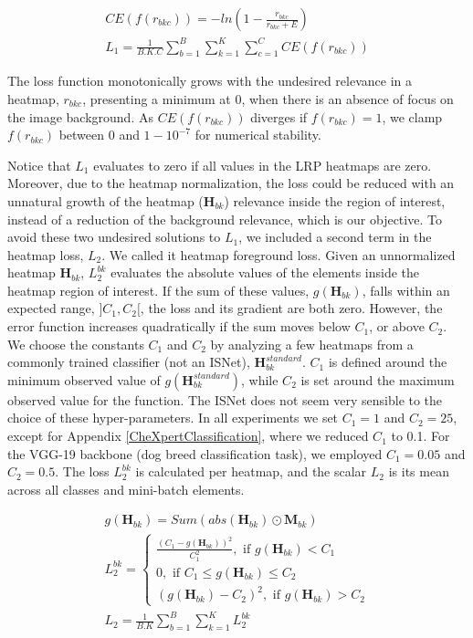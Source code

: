 \documentclass[fleqn,10pt]{wlscirep}
\begin{document}
{\begin{gather}
CE(f(r_{bkc}))=-ln(1-\frac{r_{bkc}}{r_{bkc}+E})\\
L_{1}=\frac{1}{B.K.C}\sum_{b=1}^{B}\sum_{k=1}^{K}\sum_{c=1}^{C}CE(f(r_{bkc}))
\end{gather}

The loss function monotonically grows with the undesired relevance in a heatmap, $r_{bkc}$, presenting a minimum at 0, when there is an absence of focus on the image background. As $CE(f(r_{bkc}))$ diverges if $f(r_{bkc})=1$, we clamp $f(r_{bkc})$ between 0 and $1-10^{-7}$ for numerical stability.

Notice that $L_{1}$ evaluates to zero if all values in the LRP heatmaps are zero. Moreover, due to the heatmap normalization, the loss could be reduced with an unnatural growth of the heatmap ($\bm{H}_{bk}$) relevance inside the region of interest, instead of a reduction of the background relevance, which is our objective. To avoid these two undesired solutions to $L_{1}$, we included a second term in the heatmap loss, $L_{2}$. We called it heatmap foreground loss. Given an unnormalized heatmap $\bm{H}_{bk}$, $L_{2}^{bk}$ evaluates the absolute values of the elements inside the heatmap region of interest. If the sum of these values, $g(\bm{H}_{bk})$, falls within an expected range, $]C_{1},C_{2}[$, the loss and its gradient are both zero. However, the error function increases quadratically if the sum moves below $C_{1}$, or above $C_{2}$. We choose the constants $C_{1}$ and $C_{2}$ by analyzing a few heatmaps from a commonly trained classifier (not an ISNet), $\bm{H}_{bk}^{standard}$. $C_{1}$ is defined around the minimum observed value of $g(\bm{H}_{bk}^{standard})$, while $C_{2}$ is set around the maximum observed value for the function. The ISNet does not seem very sensible to the choice of these hyper-parameters. In all experiments we set $C_{1}=1$ and $C_{2}=25$, except for Appendix \ref{CheXpertClassification}, where we reduced $C_{1}$ to 0.1. For the VGG-19 backbone (dog breed classification task), we employed $C_{1}=0.05$ and $C_{2}=0.5$. The loss $L_{2}^{bk}$ is calculated per heatmap, and the scalar $L_{2}$ is its mean across all classes and mini-batch elements.

\begin{gather}
g(\bm{H}_{bk})=Sum(abs(\bm{H}_{bk}) \odot \bm{M}_{bk}) \\
\label{L2}
L_{2}^{bk}=
\begin{cases}
\frac{(C_{1}-g(\bm{H}_{bk}))^{2}}{C_{1}^{2}}, \mbox{ if } g(\bm{H}_{bk}) < C_{1} \\
0, \mbox{ if } C_{1} \le g(\bm{H}_{bk}) \le C_{2} \\
(g(\bm{H}_{bk})-C_{2})^{2}, \mbox{ if } g(\bm{H}_{bk}) > C_{2}
\end{cases} \\
L_{2}=\frac{1}{B.K}\sum_{b=1}^{B}\sum_{k=1}^{K}L_{2}^{bk}
\end{gather}

}
\end{document}
